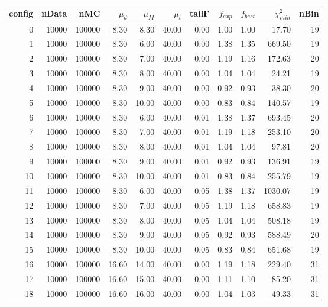 \begin{table}[htp] 
\begin{center} 
\begin{tabular}{|r|rr| rr| rr| rr| rr|} 
\hline 
config& nData&   nMC&$\mu_d$&$\mu_M$&$\mu_t$& tailF&$f_{exp}$&$f_{best}$&$\chi^2_{min}$&  nBin \\ 
\hline 
     0& 10000&100000&  8.30&  8.30& 40.00&  0.00&  1.00&  1.00& 17.70&    19 \\ 
     1& 10000&100000&  8.30&  6.00& 40.00&  0.00&  1.38&  1.35&669.50&    19 \\ 
     2& 10000&100000&  8.30&  7.00& 40.00&  0.00&  1.19&  1.16&172.63&    20 \\ 
     3& 10000&100000&  8.30&  8.00& 40.00&  0.00&  1.04&  1.04& 24.21&    19 \\ 
     4& 10000&100000&  8.30&  9.00& 40.00&  0.00&  0.92&  0.93& 38.30&    20 \\ 
     5& 10000&100000&  8.30& 10.00& 40.00&  0.00&  0.83&  0.84&140.57&    19 \\ 
\hline 
     6& 10000&100000&  8.30&  6.00& 40.00&  0.01&  1.38&  1.37&693.45&    20 \\ 
     7& 10000&100000&  8.30&  7.00& 40.00&  0.01&  1.19&  1.18&253.10&    20 \\ 
     8& 10000&100000&  8.30&  8.00& 40.00&  0.01&  1.04&  1.04& 97.81&    20 \\ 
     9& 10000&100000&  8.30&  9.00& 40.00&  0.01&  0.92&  0.93&136.91&    19 \\ 
    10& 10000&100000&  8.30& 10.00& 40.00&  0.01&  0.83&  0.84&255.79&    19 \\ 
\hline 
    11& 10000&100000&  8.30&  6.00& 40.00&  0.05&  1.38&  1.37&1030.07&    19 \\ 
    12& 10000&100000&  8.30&  7.00& 40.00&  0.05&  1.19&  1.18&658.83&    19 \\ 
    13& 10000&100000&  8.30&  8.00& 40.00&  0.05&  1.04&  1.04&508.18&    19 \\ 
    14& 10000&100000&  8.30&  9.00& 40.00&  0.05&  0.92&  0.93&588.49&    20 \\ 
    15& 10000&100000&  8.30& 10.00& 40.00&  0.05&  0.83&  0.84&651.68&    19 \\ 
\hline 
    16& 10000&100000& 16.60& 14.00& 40.00&  0.00&  1.19&  1.18&229.40&    31 \\ 
    17& 10000&100000& 16.60& 15.00& 40.00&  0.00&  1.11&  1.10& 85.20&    31 \\ 
    18& 10000&100000& 16.60& 16.00& 40.00&  0.00&  1.04&  1.03& 49.33&    31 \\ 

\end{tabular}
\end{center}
\end{table}
